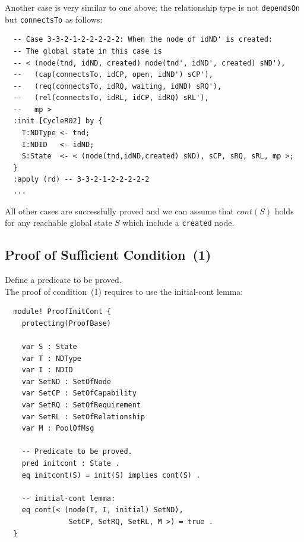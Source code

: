 \documentclass[12pt]{report}
\begin{document}
Another case is very similar to one above; the relationship type
is not {\tt dependsOn} but {\tt connectsTo} as follows:
\small
\begin{verbatim}
  -- Case 3-3-2-1-2-2-2-2-2: When the node of idND' is created:
  -- The global state in this case is
  -- < (node(tnd, idND, created) node(tnd', idND', created) sND'),
  --   (cap(connectsTo, idCP, open, idND') sCP'),
  --   (req(connectsTo, idRQ, waiting, idND) sRQ'),
  --   (rel(connectsTo, idRL, idCP, idRQ) sRL'),
  --   mp >
  :init [CycleR02] by {
    T:NDType <- tnd;
    I:NDID   <- idND;
    S:State  <- < (node(tnd,idND,created) sND), sCP, sRQ, sRL, mp >;
  }
  :apply (rd) -- 3-3-2-1-2-2-2-2-2
  ...
\end{verbatim}
\normalsize

All other cases are successfully proved and we can assume that
$cont(S)$ holds for any reachable global state $S$ which include a
{\tt created} node.

\subsection{Proof of Sufficient Condition~(1)}
\label{sec:TOSCAinitcont}
 Define a predicate to be proved. \\
The proof of condition~(1) requires to use the
initial-cont lemma:
\small
\begin{verbatim}
  module! ProofInitCont {
    protecting(ProofBase)

    var S : State
    var T : NDType
    var I : NDID
    var SetND : SetOfNode
    var SetCP : SetOfCapability
    var SetRQ : SetOfRequirement
    var SetRL : SetOfRelationship
    var M : PoolOfMsg

    -- Predicate to be proved.
    pred initcont : State .
    eq initcont(S) = init(S) implies cont(S) .
  
    -- initial-cont lemma: 
    eq cont(< (node(T, I, initial) SetND), 
               SetCP, SetRQ, SetRL, M >) = true .
  }
\end{verbatim}
\normalsize
\end{document}
